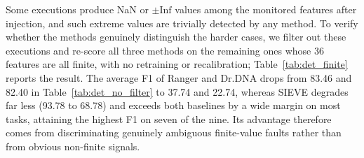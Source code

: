 Some executions produce NaN or $\pm\mathrm{Inf}$ values among the monitored features after injection, and such extreme values are trivially detected by any method. To verify whether the methods genuinely distinguish the harder cases, we filter out these executions and re-score all three methods on the remaining ones whose 36 features are all finite, with no retraining or recalibration; Table~\ref{tab:det_finite} reports the result. The average F1 of Ranger and Dr.DNA drops from 83.46 and 82.40 in Table~\ref{tab:det_no_filter} to 37.74 and 22.74, whereas SIEVE degrades far less (93.78 to 68.78) and exceeds both baselines by a wide margin on most tasks, attaining the highest F1 on seven of the nine. Its advantage therefore comes from discriminating genuinely ambiguous finite-value faults rather than from obvious non-finite signals.

